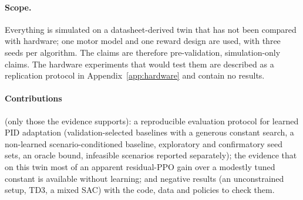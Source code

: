 \paragraph*{Scope.}
Everything is simulated on a datasheet-derived twin that has not been compared with hardware; one motor model and one reward design are used, with three seeds per algorithm. The claims are therefore pre-validation, simulation-only claims. The hardware experiments that would test them are described as a replication protocol in Appendix~\ref{app:hardware} and contain no results.

\paragraph*{Contributions} (only those the evidence supports): a reproducible evaluation protocol for learned PID adaptation (validation-selected baselines with a generous constant search, a non-learned scenario-conditioned baseline, exploratory and confirmatory seed sets, an oracle bound, infeasible scenarios reported separately); the evidence that on this twin most of an apparent residual-PPO gain over a modestly tuned constant is available without learning; and negative results (an unconstrained setup, TD3, a mixed SAC) with the code, data and policies to check them.
